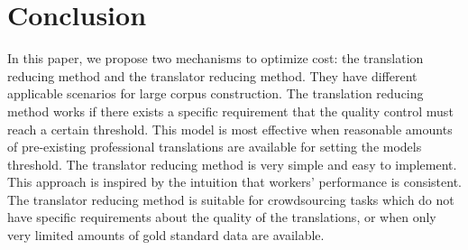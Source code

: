 \onehalfspaced

\section{Conclusion}
In this paper, we propose two mechanisms to optimize cost: the translation reducing method and the translator reducing method. They have different applicable scenarios for large corpus construction.
The translation reducing method works if there exists a specific requirement that the quality control must reach a certain threshold. 
This model is most effective when reasonable amounts of pre-existing professional translations are available for setting the models threshold. 
The translator reducing method is very simple and easy to implement. This approach is inspired by the intuition that workers' performance is consistent. The translator reducing method is suitable for crowdsourcing tasks which do not have specific requirements about the quality of the translations, 
or when only very limited amounts of gold standard data are available.
